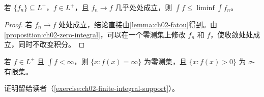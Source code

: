 \documentclass[../../main.tex]{subfiles}%
\begin{document}
\begin{corollary}\label{corollary:ch02-fatou-ae}
若 $\{f_n\}\subseteq L^+$，$f\in L^+$，且 $f_n\to f$ 几乎处处成立，则 $\int f\le\liminf\int f_n$。
\end{corollary}
\begin{proof}
若 $f_n\to f$ 处处成立，结论直接由\cref{lemma:ch02-fatou}得到。由\cref{proposition:ch02-zero-integral}，可以在一个零测集上修改 $f_n$ 和 $f$，使收敛处处成立，同时不改变积分。
\end{proof}
\begin{proposition}\label{proposition:ch02-finite-integral-support}
若 $f\in L^+$ 且 $\int f<\infty$，则 $\{x:f(x)=\infty\}$ 为零测集，且 $\{x:f(x)>0\}$ 为 $\sigma$-有限集。
\end{proposition}
证明留给读者（\cref{exercise:ch02-finite-integral-support}）。
\end{document}
